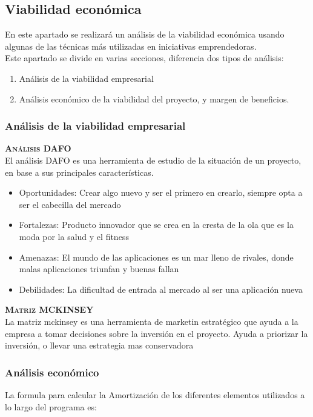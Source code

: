 \subsection{Viabilidad económica}
En este apartado se realizará un análisis de la viabilidad económica usando algunas de las técnicas más utilizadas en iniciativas emprendedoras.\\
Este apartado se divide en varias secciones, diferencia dos tipos de análisis:
\begin{enumerate}
\item Análisis  de la viabilidad empresarial
\item Análisis económico de la viabilidad del proyecto, y margen de beneficios.
\end{enumerate}
\subsubsection{Análisis de la viabilidad empresarial}
\textbf{\textsc{Análisis DAFO}}\\
El análisis DAFO \cite{DAFO} es una herramienta de estudio de la situación de un proyecto, en base a sus principales características.
\begin{itemize}
\item Oportunidades: Crear algo nuevo y ser el primero en crearlo, siempre opta a ser el cabecilla del mercado
\item Fortalezas: Producto innovador que se crea en la cresta de la ola que es la moda por la salud y el fitness
\item Amenazas: El mundo de las aplicaciones es un mar lleno de rivales, donde malas aplicaciones triunfan y buenas fallan
\item Debilidades: La dificultad de entrada al mercado al ser una aplicación nueva	
\end{itemize}
\textbf{\textsc{Matriz MCKINSEY}}\\
La matriz mckinsey \cite{matriz} es una herramienta de marketin estratégico que ayuda a la empresa a tomar decisiones sobre la inversión en el proyecto. Ayuda a priorizar la inversión, o llevar una estrategia mas conservadora
\pagebreak
\subsubsection{Análisis económico}
La formula para calcular la Amortización de los diferentes elementos utilizados a lo largo del programa es:

